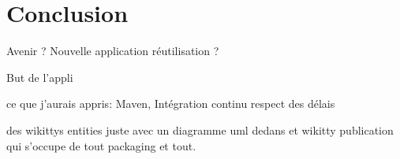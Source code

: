 \section{Conclusion}

Avenir ?
Nouvelle application
réutilisation ?

But de l'appli




ce que j'aurais appris:
Maven,
Intégration continu
respect des délais


des wikittys entities juste avec un diagramme uml dedans et wikitty publication qui s'occupe de tout packaging et tout.



